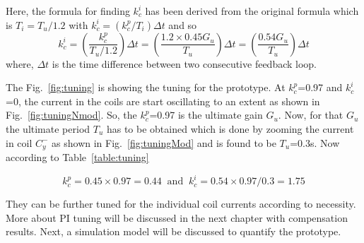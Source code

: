 \FloatBarrier
Here, the formula for finding $k_c^i$ has been derived from the original formula which is $T_i=T_u/1.2$ with $k_c^i=(k_c^p/T_i)\Delta t$ and so
\begin{equation}
    k_c^i=\left(\frac{k_c^p}{T_u/1.2}\right)\Delta t=\left(\frac{1.2\times0.45 G_u}{T_u}\right)\Delta t=\left(\frac{0.54 G_u}{T_u}\right)\Delta t
\end{equation}
where, $\Delta t$ is the time difference between two consecutive feedback loop.


The Fig.~\ref{fig:tuning} is showing the tuning for the prototype. At $k_c^p$=0.97 and $k_c^i$=0, the current in the coils are start oscillating to an extent as shown in Fig.~\ref{fig:tuningNmod}. So, the $k_c^p$=0.97 is the ultimate gain $G_u$. Now, for that $G_u$ the ultimate period $T_u$ has to be obtained which is done by zooming the current in coil $C_y^-$ as shown in Fig.~\ref{fig:tuningMod} and is found to be $T_u$=0.3s. Now according to Table~\ref{table:tuning}

\begin{equation}
    k_c^p=0.45\times0.97=0.44\;\;\text{and}\;\; k_c^i=0.54\times0.97/0.3=1.75
\end{equation}


They can be further tuned for the individual coil currents according to necessity. More about PI tuning will be discussed in the next chapter with compensation results. Next, a simulation model will be discussed to quantify the prototype.



 
 
% 


